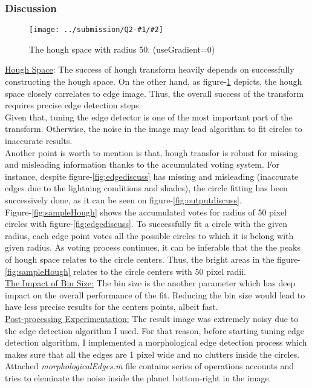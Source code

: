 \documentclass{article}
\newcommand{\listFigure}[4]{
\begin{figure}[H]
	\texttt{[image: ../submission/Q2-\#1/\#2]}
	\caption{#3\label{fig:#4}}
\end{figure}		
}
\begin{document}
	\subsubsection{Discussion}
	\listFigure{2}{Q2-2-houghSpace-radius-50-Grad-0--n-1-jupiter.png}{The
	hough space with radius 50. (useGradient=0)}{sampleHough1}
	\underline{Hough Space}: The success of hough transform heavily depends on
	successfully constructing the hough space. On the other hand, as
	figure-\ref{fig:sampleHough1} depicts, the hough space closely correlates to
	edge image. Thus, the overall success of the transform requires precise edge
	detection steps. \\
	Given that, tuning the edge detector is one of the most important part of the
	transform. Otherwise, the noise in the image may lead algorithm to fit circles
	to inaccurate results. \\
	Another point is worth to mention is that, hough transfor is robust for missing
	and misleading information thanks to the accumulated voting system. For
	instance, despite figure-\ref{fig:edgediscuss} has missing and misleading
	(inaccurate edges due to the lightning conditions and shades), the circle
	fitting has been successively done, as it can be seen on
	figure-\ref{fig:outputdiscuss}. \\
	Figure-\ref{fig:sampleHough} shows the accumulated votes for radius of 50 pixel
	circles with figure-\ref{fig:edgediscuss}. To successfully fit a circle with
	the given radius, each edge point votes all the possible circles to which it is
	belong with given radius. As voting process continues, it can be inferable that
	the the peaks of hough space relates to the circle centers. Thus, the bright
	areas in the figure-\ref{fig:sampleHough} relates to the circle centers with 50 pixel radii. \\
	\underline{The Impact of Bin Size:} The bin size is the another parameter which
	has deep impact on the overall performance of the fit. Reducing the bin size would lead
	to have less precise results for the centers points, albeit fast. \\
	\underline{Post-processing Experimentation:} The result image was extremely
	noisy due to the edge detection algorithm I used. For that reason, before
	starting tuning edge detection algorithm, I implemented a morphological edge
	detection process which makes sure that all the edges are 1 pixel wide and no
	clutters inside the circles. \\
	Attached \textit{morphologicalEdges.m} file
	contains series of operations accounts and tries to eleminate the noise inside
	the planet bottom-right in the image.
\end{document}
